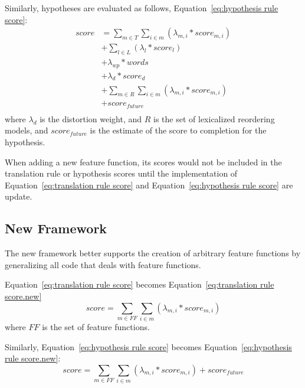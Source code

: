 \documentclass{pbml}
\begin{document}
Similarly, hypotheses are evaluated as follows, Equation~\ref{eq:hypothesis rule score}:
\begin{equation}
\begin{split}
 score & =  \sum_{m \in T} \sum_{i \in m} (\lambda_{m,i} * score_{m,i}) \\
    & + \sum_{l \in L} (\lambda_l * score_l) \\
    & + \lambda_{wp} * words \\
    & + \lambda_d * score_d \\
    & + \sum_{m \in R} \sum_{i \in m} (\lambda_{m,i} * score_{m,i})  \\
    & + score_{future} \\
\label{eq:hypothesis rule score}
\end{split}
\end{equation}
where $\lambda_d$ is the distortion weight, and $R$ is the set of lexicalized reordering models, and $score_{future}$ is the estimate of the score to completion for the hypothesis.

When adding a new feature function, its scores would not be included in the translation rule or hypothesis scores until the implementation of Equation~\ref{eq:translation rule score} and Equation~\ref{eq:hypothesis rule score} are update.



\subsection{New Framework}
The new framework better supports the creation of arbitrary feature functions by generalizing all code that deals with feature functions.

Equation~\ref{eq:translation rule score} becomes Equation~\ref{eq:translation rule score.new}
\begin{equation}
  score = \sum_{m \in FF} \sum_{i \in m} (\lambda_{m,i} * score_{m,i})
\label{eq:translation rule score.new}
\end{equation}
where $FF$ is the set of feature functions.

Similarly, Equation~\ref{eq:hypothesis rule score} becomes Equation~\ref{eq:hypothesis rule score.new}:
\begin{equation}
  score =  \sum_{m \in FF} \sum_{i \in m} (\lambda_{m,i} * score_{m,i})
	  + score_{future}
\label{eq:hypothesis rule score.new}
\end{equation}
\end{document}
